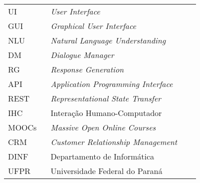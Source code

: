 

\begin{listaacron}

\begin{longtable}[l]{p{0.2\linewidth}p{0.7\linewidth}}
UI & \it{User Interface}\\
GUI & \it{Graphical User Interface}\\
NLU & \it{Natural Language Understanding}\\
DM & \it{Dialogue Manager}\\
RG & \it{Response Generation}\\
API & \it{Application Programming Interface}\\
REST & \it{Representational State Transfer}\\
IHC & Interação Humano-Computador\\
MOOCs & \it{Massive Open Online Courses}\\
CRM & \it{Customer Relationship Management}\\
DINF & Departamento de Informática\\
UFPR & Universidade Federal do Paraná\\
\end{longtable}

\end{listaacron}

